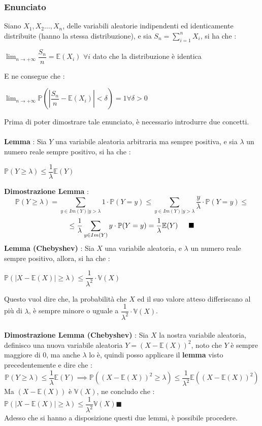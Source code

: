 \documentclass[12pt, letterpaper]{article}
\newcommand{\E}{{\mathbb E}}
\newcommand{\V}{{\mathbb V}}
\newcommand{\acc}{\\\hphantom{}\\}
\newcommand{\Prob}{{\mathbb P}}
\begin{document}
\subsubsection{Enunciato}
Siano \(X_1,X_2\dots,X_n\), delle variabili aleatorie indipendenti ed identicamente 
distribuite (hanno la stessa distribuzione), e sia \(S_n=\displaystyle\sum_{i=1}^nX_i\), si ha che : \begin{center}
    \(\displaystyle\lim_{n\rightarrow +\infty}\dfrac{S_n}{n}=\E(X_i)\) \hphantom{aa}\(\forall i\) dato che la distribuzione è identica
\end{center}
E ne consegue che : \begin{center}
    \(\displaystyle\lim_{n\rightarrow +\infty}\Prob(|\dfrac{S_n}{n}-\E(X_i)|<\delta)=1\)\hphantom{aa}\(\forall \delta>0\)
\end{center}
Prima di poter dimostrare tale enunciato, è necessario introdurre due concetti.\acc 
\textbf{Lemma }: Sia \(Y\) una variabile aleatoria arbitraria ma sempre positiva, e sia 
\(\lambda\) un numero reale sempre positivo, si ha che :\begin{center}
    \(\Prob(Y\ge\lambda)\le\dfrac{1}{\lambda}\E(Y)\)\
\end{center}
\textbf{Dimostrazione Lemma} : \begin{equation}
    \Prob(Y\ge\lambda)=\sum_{y\in Im(Y)|y>\lambda}1\cdot \Prob(Y=y)\le \sum_{y\in Im(Y)|y>\lambda}\dfrac{y}{\lambda}\cdot \Prob(Y=y)\le
\end{equation}\begin{equation}
    \le \dfrac{1}{\lambda}\sum_{y\in Im(Y)}y\cdot \Prob(Y=y)=\dfrac{1}{\lambda}\E(Y)\text{\hphantom{aaa}}\blacksquare
\end{equation}
\textbf{Lemma (Chebyshev)} : Sia \(X\) una variabile aleatoria, e \(\lambda\) un numero reale sempre positivo, 
allora, si ha che :\begin{center}
    \(
    \Prob(|X-\E(X)|\ge\lambda)\le \dfrac{1}{\lambda^2}\cdot \V(X)    
    \)
\end{center}
Questo vuol dire che, la probabilità che \(X\) ed il suo valore atteso differiscano al più di \(\lambda\), 
è sempre minore o uguale a \(\dfrac{1}{\lambda^2}\cdot \V(X)\).\acc 
\textbf{Dimostrazione Lemma (Chebyshev)} : Sia \(X\) la nostra variabile aleatoria, definisco una 
nuova variabile aleatoria \(Y=(X-\E(X))^2\), noto che \(Y\) è sempre maggiore di 
\(0\), ma anche \(\lambda\) lo è, quindi posso applicare il \textbf{lemma} visto precedentemente e dire 
che :\begin{equation}
    \Prob(Y\ge\lambda)\le \dfrac{1}{\lambda}\E(Y)\implies \Prob((X-\E(X))^2\ge\lambda)\le \dfrac{1}{\lambda^2}\E((X-\E(X))^2)
\end{equation}
Ma \((X-\E(X))\) è \(\V(X)\), ne concludo che : \(\Prob(|X-\E(X)|\ge\lambda)\le \dfrac{1}{\lambda^2}\V(X)\)\hphantom{text}\(\blacksquare\)
\\Adesso che si hanno a disposizione questi due lemmi, è possibile procedere.
\end{document}
